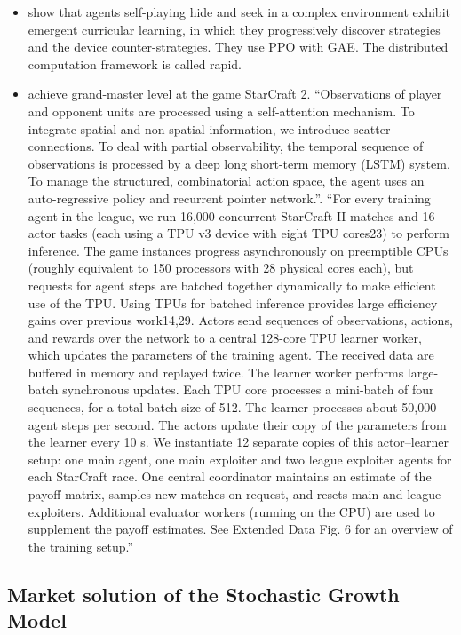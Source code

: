 \documentclass[11pt,english]{article}
\begin{document}
\begin{itemize}
\begin{itemize}
\item \citet{baker2019} show that agents self-playing hide and seek in a complex environment exhibit emergent curricular learning, in which they progressively discover strategies and the device counter-strategies. They use PPO with GAE. The distributed computation framework is called rapid. 
\item \citet{vinyals2019} achieve grand-master level at the game StarCraft 2. ``Observations of player and opponent units are processed using a self-attention mechanism. To integrate spatial and non-spatial information, we introduce scatter connections. To deal with partial observability, the temporal sequence of observations is processed by a deep long short-term memory (LSTM) system. To manage the structured, combinatorial action space, the agent uses an auto-regressive policy and recurrent
pointer network.''. ``For every training agent in the league, we run 16,000 concurrent StarCraft II matches and 16 actor tasks (each
using a TPU v3 device with eight TPU cores23) to perform inference. The game instances progress asynchronously on preemptible CPUs (roughly equivalent to 150 processors with 28 physical cores each), but requests for agent steps are batched together dynamically to make efficient use of the TPU. Using TPUs for batched inference provides large efficiency gains over previous work14,29. Actors send sequences of observations, actions, and rewards over the network to a central 128-core TPU learner
worker, which updates the parameters of the training agent. The received data are buffered in memory and replayed twice. The learner worker performs large-batch synchronous updates. Each TPU core processes a mini-batch of four sequences, for a total batch size of 512. The learner processes about 50,000 agent steps per second. The actors update their copy of the parameters from the learner every 10 s. We instantiate 12 separate copies of this actor--learner setup: one main agent, one main exploiter and two league exploiter agents for each StarCraft race. One central coordinator maintains an estimate of the payoff matrix, samples new matches on request, and resets main and league exploiters. Additional evaluator workers (running on the CPU) are used to supplement the payoff estimates. See Extended Data Fig. 6 for an overview of the training setup.''
\end{itemize}
\end{itemize}

\subsection{Market solution of the Stochastic Growth Model}
\end{document}
